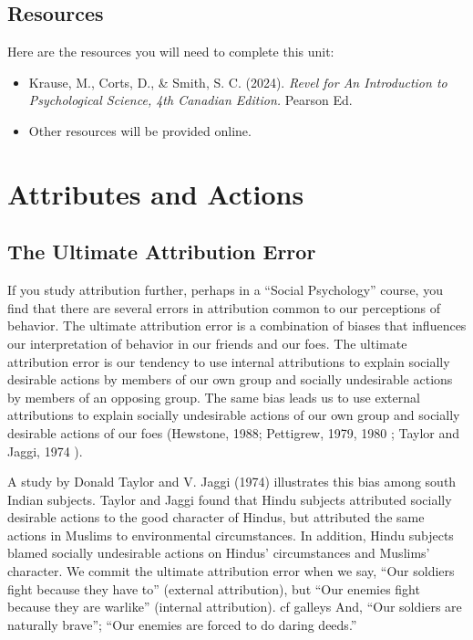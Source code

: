\documentclass[
]{book}
\providecommand{\tightlist}{%
  \setlength{\itemsep}{0pt}\setlength{\parskip}{0pt}}
\begin{document}
\hypertarget{resources-5}{%
\subsection*{Resources}\label{resources-5}}

Here are the resources you will need to complete this unit:

\begin{itemize}
\tightlist
\item
  Krause, M., Corts, D., \& Smith, S. C. (2024). \emph{Revel for An Introduction to Psychological Science, 4th Canadian Edition.} Pearson Ed.
\item
  Other resources will be provided online.
\end{itemize}

\hypertarget{attributes-and-actions}{%
\section{Attributes and Actions}\label{attributes-and-actions}}

\hypertarget{the-ultimate-attribution-error}{%
\subsection*{The Ultimate Attribution Error}\label{the-ultimate-attribution-error}}

If you study attribution further, perhaps in a ``Social Psychology'' course, you find that there are several errors in attribution common to our perceptions of behavior. The ultimate attribution error is a combination of biases that influences our interpretation of behavior in our friends and our foes. The ultimate attribution error is our tendency to use internal attributions to explain socially desirable actions by members of our own group and socially undesirable actions by members of an opposing group. The same bias leads us to use external attributions to explain socially undesirable actions of our own group and socially desirable actions of our foes (Hewstone, 1988; Pettigrew, 1979, 1980 ; Taylor and Jaggi, 1974 ).

A study by Donald Taylor and V. Jaggi (1974) illustrates this bias among south Indian subjects. Taylor and Jaggi found that Hindu subjects attributed socially desirable actions to the good character of Hindus, but attributed the same actions in Muslims to environmental circumstances. In addition, Hindu subjects blamed socially undesirable actions on Hindus' circumstances and Muslims' character. We commit the ultimate attribution error when we say, ``Our soldiers fight because they have to'' (external attribution), but ``Our enemies fight because they are warlike'' (internal attribution). cf galleys And, ``Our soldiers are naturally brave''; ``Our enemies are forced to do daring deeds.''
\end{document}
